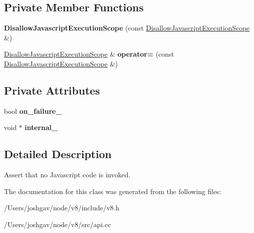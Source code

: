 \subsection*{Private Member Functions}
\begin{DoxyCompactItemize}
\item 
{\bfseries Disallow\+Javascript\+Execution\+Scope} (const \hyperlink{classv8_1_1_isolate_1_1_disallow_javascript_execution_scope}{Disallow\+Javascript\+Execution\+Scope} \&)\hypertarget{classv8_1_1_isolate_1_1_disallow_javascript_execution_scope_a08a0a0dfb4804078bb86bf266aa36f05}{}\label{classv8_1_1_isolate_1_1_disallow_javascript_execution_scope_a08a0a0dfb4804078bb86bf266aa36f05}

\item 
\hyperlink{classv8_1_1_isolate_1_1_disallow_javascript_execution_scope}{Disallow\+Javascript\+Execution\+Scope} \& {\bfseries operator=} (const \hyperlink{classv8_1_1_isolate_1_1_disallow_javascript_execution_scope}{Disallow\+Javascript\+Execution\+Scope} \&)\hypertarget{classv8_1_1_isolate_1_1_disallow_javascript_execution_scope_aa8f45d19c0dc9467a0df64e4081ce75c}{}\label{classv8_1_1_isolate_1_1_disallow_javascript_execution_scope_aa8f45d19c0dc9467a0df64e4081ce75c}

\end{DoxyCompactItemize}
\subsection*{Private Attributes}
\begin{DoxyCompactItemize}
\item 
bool {\bfseries on\+\_\+failure\+\_\+}\hypertarget{classv8_1_1_isolate_1_1_disallow_javascript_execution_scope_a2b3fe3cb1347fadbb6233e3ba4802ed9}{}\label{classv8_1_1_isolate_1_1_disallow_javascript_execution_scope_a2b3fe3cb1347fadbb6233e3ba4802ed9}

\item 
void $\ast$ {\bfseries internal\+\_\+}\hypertarget{classv8_1_1_isolate_1_1_disallow_javascript_execution_scope_ac86111f7dadf1eb5d5ac2c49b3faa06a}{}\label{classv8_1_1_isolate_1_1_disallow_javascript_execution_scope_ac86111f7dadf1eb5d5ac2c49b3faa06a}

\end{DoxyCompactItemize}


\subsection{Detailed Description}
Assert that no Javascript code is invoked. 

The documentation for this class was generated from the following files\+:\begin{DoxyCompactItemize}
\item 
/\+Users/joshgav/node/v8/include/v8.\+h\item 
/\+Users/joshgav/node/v8/src/api.\+cc\end{DoxyCompactItemize}
